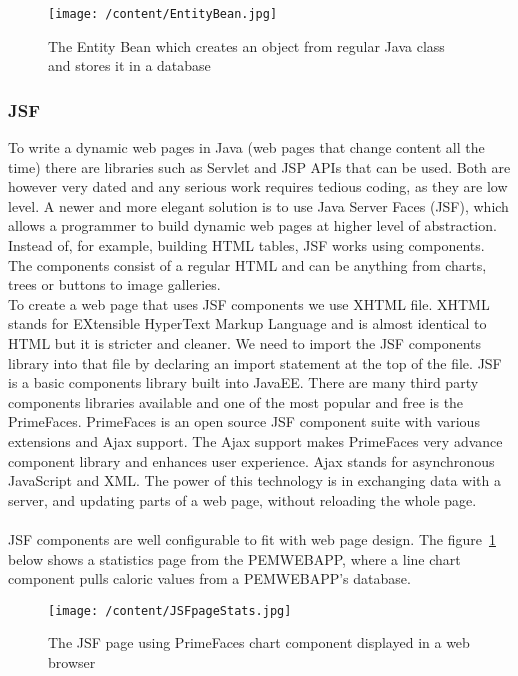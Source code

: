 \documentclass[12pt, a4paper]{report}   %
\begin{document}
\begin{enumerate}
\begin{figure}[H]
  \centering
	\texttt{[image: /content/EntityBean.jpg]}
	  \caption{The Entity Bean which creates an object from regular Java class and stores it in a database}
\end{figure}


\subsubsection{JSF}
To write a dynamic web pages in Java (web pages that change content all the time) there are libraries such as Servlet and JSP APIs that can be used. Both are however very dated and any serious work requires tedious coding, as they are low level. A newer and more elegant solution is to use Java Server Faces (JSF), which allows a programmer to build dynamic web pages at higher level of abstraction. Instead of, for example, building HTML tables, JSF works using components. The components consist of a regular HTML and can be anything from charts, trees or buttons to image galleries.\\
To create a web page that uses JSF components we use XHTML file. XHTML stands for EXtensible HyperText Markup Language and is almost identical to HTML but it is stricter and cleaner. We need to import the JSF components library into that file by declaring an import statement at the top of the file. 
JSF is a basic components library built into JavaEE. There are many third party components libraries available and one of the most popular and free is the PrimeFaces. PrimeFaces is an open source JSF component suite with various extensions and Ajax support. The Ajax support makes PrimeFaces very advance component library and enhances user experience. Ajax stands for asynchronous JavaScript and XML. The power of this technology is in exchanging data with a server, and updating parts of a web page, without reloading the whole page.\\ \\
JSF components are well configurable to fit with web page design. The figure~\ref{JSFpageStat} below shows a statistics page from the PEMWEBAPP, where a line chart component pulls caloric values from a PEMWEBAPP's database.


\begin{figure}[H]
  \centering
	\texttt{[image: /content/JSFpageStats.jpg]}
	  \caption{The JSF page using PrimeFaces chart component displayed in a web browser}
	  \label{JSFpageStat}
\end{figure}



\end{enumerate}
\end{document}
